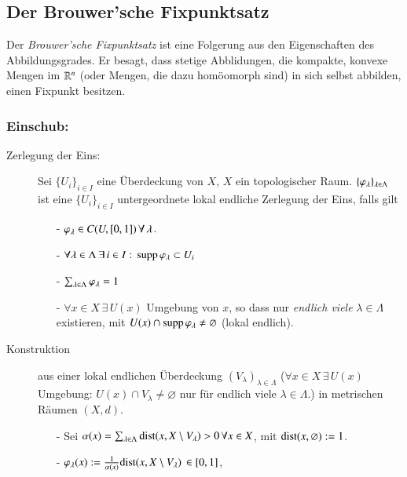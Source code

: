 \subsection{Der Brouwer'sche Fixpunktsatz}

Der \textit{Brouwer'sche Fixpunktsatz} ist eine Folgerung aus den Eigenschaften des Abbildungsgrades.
Er besagt, dass stetige Abblidungen, die kompakte, konvexe Mengen im $\mathbb{R}^n$ (oder Mengen, die dazu
homöomorph sind) in sich selbst abbilden, einen Fixpunkt besitzen.

\subsubsection{Einschub:}

\begin{description}
        \item[Zerlegung der Eins:]
        Sei $\{U_i\}_{i\in I}$ eine Überdeckung von $X$, $X$ ein topologischer Raum.
        $\{\varphi_\lambda\}_{\lambda\in\Lambda}$ ist eine $\{U_i\}_{i\in I}$ untergeordnete lokal endliche
        Zerlegung der Eins, falls gilt
        \begin{itemize}
        \item[-] $\varphi_\lambda \in C(U,[0,1]) \,\forall\, \lambda$.
        \item[-] $\forall \lambda\in \Lambda\, \exists \, i \in I: \, \mathrm{supp}\, \varphi_\lambda\subset U_i$
        \item[-] $\sum_{\lambda \in \Lambda} \varphi _\lambda=1$
        \item[-] $\forall x \in X \, \exists \, U(x)$ Umgebung von $x$, so dass nur
        \textit{endlich viele} $\lambda \in \Lambda$ existieren, mit $U(x)\cap \mathrm{supp}\, \varphi_\lambda\neq 
        \varnothing$ (lokal endlich).
        \end{itemize}
        \item[Konstruktion] aus einer lokal endlichen Überdeckung $(V_\lambda)_{\lambda\in\Lambda}$ 
        ($\forall x\in X \, \exists \, U(x)$ Umgebung: $U(x)\cap V_\lambda\neq \varnothing$ nur für
         endlich viele $\lambda\in \Lambda$.) in metrischen Räumen $(X,d)$.
        \begin{itemize}
            \item[-] Sei $\alpha(x)=\sum_{\lambda\in \Lambda} \mathrm{dist}(x,X\setminus V_\lambda)>0 \, \forall
            x \in X$, mit $\mathrm{dist}(x,\varnothing):=1$.
            \item[-] $\varphi _\lambda(x):=\frac{1}{\alpha(x)}\mathrm{dist}(x,X\setminus V_\lambda) \, \in [0,1]$,

\end{itemize}
\end{description}
